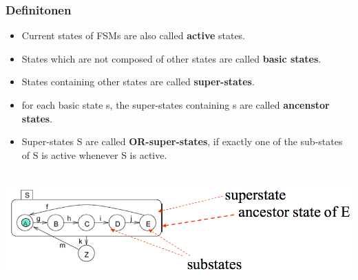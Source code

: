 {\subsubsection{Definitonen}
\begin{itemize}
  \item Current states of FSMs are also called \textbf{active} states.
  \item States which are not composed of other states are called \textbf{basic
  states}.
  \item States containing other states are called \textbf{super-states}.
  \item for each basic state s, the super-states containing s are called
  \textbf{ancenstor states}.
  \item Super-states S are called \textbf{OR-super-states}, if exactly one of
  the sub-states of S is active whenever S is active.\\\\   
\end{itemize}
\includegraphics[scale = 0.3]{images/FSM/definition_statechart}

}
